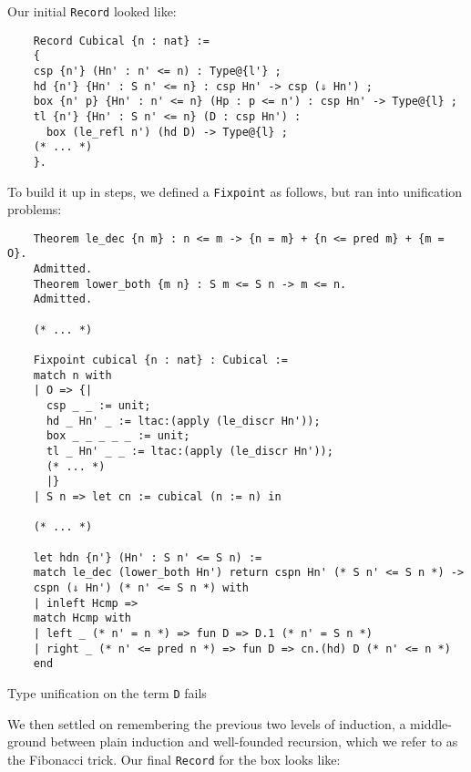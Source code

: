 \documentclass[10pt]{art}
\begin{document}
Our initial \texttt{Record} looked like:

\begin{listing}[H]
  \begin{verbatim}
    Record Cubical {n : nat} :=
    {
    csp {n'} (Hn' : n' <= n) : Type@{l'} ;
    hd {n'} {Hn' : S n' <= n} : csp Hn' -> csp (⇓ Hn') ;
    box {n' p} {Hn' : n' <= n} (Hp : p <= n') : csp Hn' -> Type@{l} ;
    tl {n'} {Hn' : S n' <= n} (D : csp Hn') :
      box (le_refl n') (hd D) -> Type@{l} ;
    (* ... *)
    }.
  \end{verbatim}
\end{listing}

To build it up in steps, we defined a \texttt{Fixpoint} as follows, but ran into unification problems:

\begin{listing}[H]
  \begin{verbatim}
    Theorem le_dec {n m} : n <= m -> {n = m} + {n <= pred m} + {m = O}.
    Admitted.
    Theorem lower_both {m n} : S m <= S n -> m <= n.
    Admitted.

    (* ... *)

    Fixpoint cubical {n : nat} : Cubical :=
    match n with
    | O => {|
      csp _ _ := unit;
      hd _ Hn' _ := ltac:(apply (le_discr Hn'));
      box _ _ _ _ _ := unit;
      tl _ Hn' _ _ := ltac:(apply (le_discr Hn'));
      (* ... *)
      |}
    | S n => let cn := cubical (n := n) in

    (* ... *)

    let hdn {n'} (Hn' : S n' <= S n) :=
    match le_dec (lower_both Hn') return cspn Hn' (* S n' <= S n *) ->
    cspn (⇓ Hn') (* n' <= S n *) with
    | inleft Hcmp =>
    match Hcmp with
    | left _ (* n' = n *) => fun D => D.1 (* n' = S n *)
    | right _ (* n' <= pred n *) => fun D => cn.(hd) D (* n' <= n *)
    end
    \end{verbatim}
  \caption{Type unification on the term \texttt{D} fails}
\end{listing}

We then settled on remembering the previous two levels of induction, a middle-ground between plain induction and well-founded recursion, which we refer to as the Fibonacci trick. Our final \texttt{Record} for the box looks like:
\end{document}
